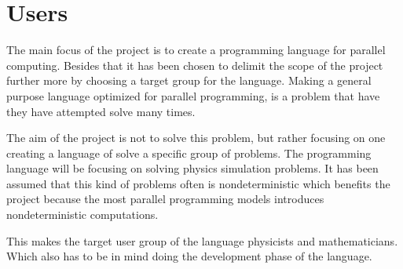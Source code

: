 \section{Users}
\label{sec:users}

The main focus of the project is to create a programming language for parallel computing. Besides that it has been chosen to delimit the scope of the project further more by choosing a target group for the language. Making a general purpose language optimized for parallel programming, is a problem that have they have attempted solve many times\cite{parallel programming languages}. 

The aim of the project is not to solve this problem, but rather focusing on one creating a language of solve a specific group of problems. The programming language will be focusing on solving physics simulation problems. It has been assumed that this kind of problems often is nondeterministic which benefits the project because the most parallel programming models introduces nondeterministic computations. 

This makes the target user group of the language physicists and mathematicians. Which also has to be in mind doing the development phase of the language.
